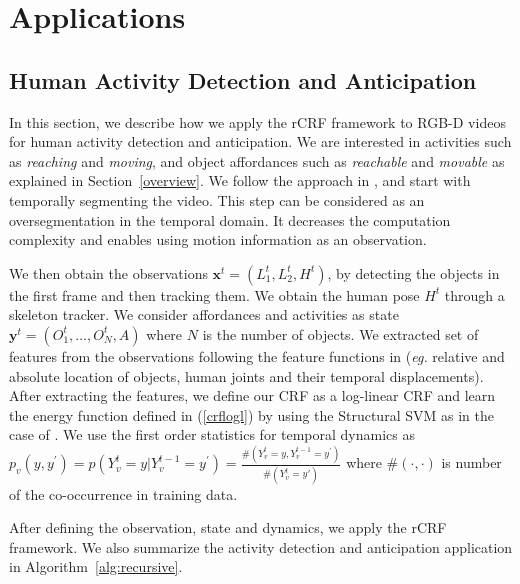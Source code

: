 \section{Applications}
\subsection{Human Activity Detection and Anticipation}
\label{rgbd}
In this section, we describe how we apply the rCRF framework to RGB-D videos for human activity detection and anticipation. We are interested in activities such as \emph{reaching} and \emph{moving}, and object affordances such as \emph{reachable} and \emph{movable} as explained in Section~\ref{overview}. We follow the approach in \cite{hemaIJRR}, and start with temporally segmenting the video. This step can be considered as an oversegmentation in the temporal domain. It decreases the computation complexity and enables using motion information as an observation.

We then obtain the observations $\mathbf{x}^t=(L_1^t,L_2^t,H^t)$, by detecting the objects in the first frame and then tracking them. We obtain the human pose $H^t$ through a skeleton tracker. We consider affordances and activities as state \mbox{$\mathbf{y}^t=(O^t_1,\ldots,O^t_N,A)$} where $N$ is the number of objects. We extracted set of features from the observations following the feature functions in \cite{hemaIJRR} (\emph{eg.} relative and absolute location of objects, human joints and their temporal displacements). After extracting the features, we define our CRF as a log-linear CRF and learn the energy function defined in (\ref{crflogl}) by using the Structural SVM \cite{ssvm} as in the case of \cite{hemaIJRR}. We use the first order statistics for temporal dynamics as \mbox{$p_v(y,y^\prime)=p(Y^t_v=y|Y^{t-1}_v=y^\prime)=\frac{\#(Y^t_v=y,Y^{t-1}_v=y^\prime)}{\#(Y^t_v=y\prime)}$} where $\#(\cdot,\cdot)$ is number of the co-occurrence in training data.

After defining the observation, state and dynamics, we apply the rCRF framework. We also summarize the activity detection and anticipation application in Algorithm~\ref{alg:recursive}.%

